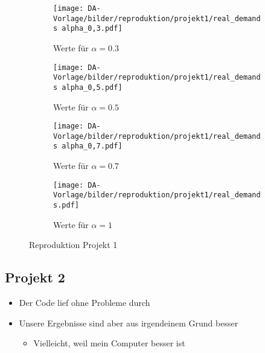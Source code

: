         \begin{figure}
            \centering
            \begin{subfigure}{0.45\textwidth}
                \centering
                \texttt{[image: DA-Vorlage/bilder/reproduktion/projekt1/real\_demands alpha\_0,3.pdf]}
                \caption{Werte für $\alpha = 0.3$}
                \label{fig:reproduktion_project_1_a=0.3}
            \end{subfigure}
            \begin{subfigure}{0.45\textwidth}
                \centering
                \texttt{[image: DA-Vorlage/bilder/reproduktion/projekt1/real\_demands alpha\_0,5.pdf]}
                \caption{Werte für $\alpha = 0.5$}
                \label{fig:reproduktion_project_1_a=0.5}
            \end{subfigure}
            \begin{subfigure}{0.45\textwidth}
                \centering
                \texttt{[image: DA-Vorlage/bilder/reproduktion/projekt1/real\_demands alpha\_0,7.pdf]}
                \caption{Werte für $\alpha = 0.7$}
                \label{fig:reproduktion_project_1_a=0.7}
            \end{subfigure}
            \begin{subfigure}{0.45\textwidth}
                \centering
                \texttt{[image: DA-Vorlage/bilder/reproduktion/projekt1/real\_demands.pdf]}
                \caption{Werte für $\alpha = 1$}
                \label{fig:reproduktion_project_1_a=1}
            \end{subfigure}
            
            \caption{Reproduktion Projekt 1}
            \label{fig:reproduktion_project_1}
        \end{figure}

    \subsection{Projekt 2}

        \begin{itemize}
            \item Der Code lief ohne Probleme durch
            \item Unsere Ergebnisse sind aber aus irgendeinem Grund besser
            \begin{itemize}
                \item Vielleicht, weil mein Computer besser ist
            \end{itemize}
        \end{itemize}

